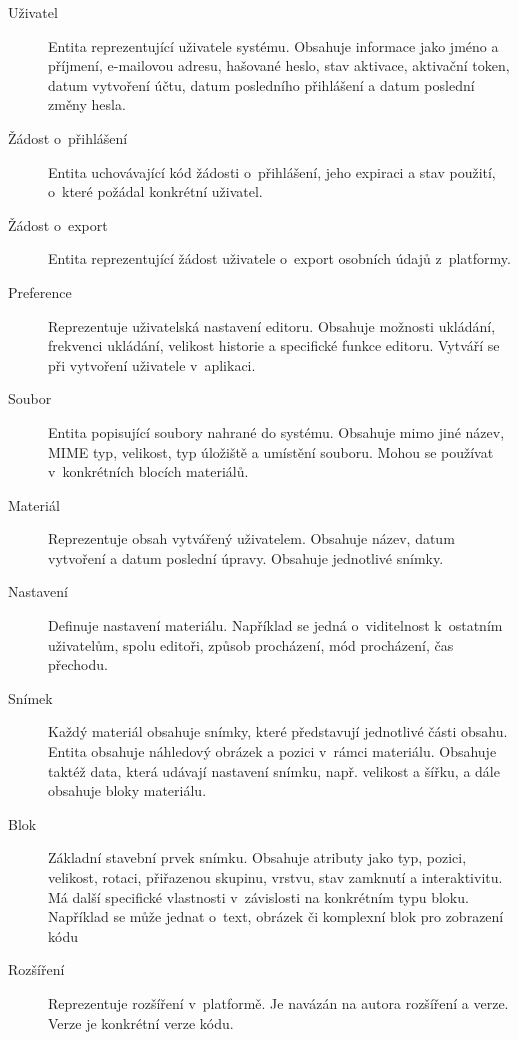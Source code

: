 \begin{description}
    \item[Uživatel] 
    Entita reprezentující uživatele systému. Obsahuje informace jako jméno a příjmení, e-mailovou adresu, hašované heslo, stav aktivace, aktivační token, datum vytvoření účtu, datum posledního přihlášení a datum poslední změny hesla.

    \item[Žádost o~přihlášení] 
    Entita uchovávající kód žádosti o~přihlášení, jeho expiraci a stav použití, o~které požádal konkrétní uživatel.
    
    \item[Žádost o~export]
    Entita reprezentující žádost uživatele o~export osobních údajů z~platformy.
    
    \item[Preference] 
    Reprezentuje uživatelská nastavení editoru. Obsahuje možnosti ukládání, frekvenci ukládání, velikost historie a specifické funkce editoru. Vytváří se při vytvoření uživatele v~aplikaci.

    \item[Soubor] 
    Entita popisující soubory nahrané do systému. Obsahuje mimo jiné název, MIME typ, velikost, typ úložiště a umístění souboru. Mohou se používat v~konkrétních blocích materiálů.
    
    \item[Materiál] 
    Reprezentuje obsah vytvářený uživatelem. Obsahuje název, datum vytvoření a datum poslední úpravy. Obsahuje jednotlivé snímky.
    
    \item[Nastavení] 
    Definuje nastavení materiálu. Například se jedná o~viditelnost k~ostatním uživatelům, spolu editoři, způsob procházení, mód procházení, čas přechodu.
    
    \item[Snímek] 
    Každý materiál obsahuje snímky, které představují jednotlivé části obsahu. Entita obsahuje náhledový obrázek a pozici v~rámci materiálu. Obsahuje taktéž data, která udávají nastavení snímku, např. velikost a šířku, a dále obsahuje bloky materiálu.
    
    \item[Blok] 
    Základní stavební prvek snímku. Obsahuje atributy jako typ, pozici, velikost, rotaci, přiřazenou skupinu, vrstvu, stav zamknutí a interaktivitu. Má další specifické vlastnosti v~závislosti na konkrétním typu bloku. Například se může jednat o~text, obrázek či komplexní blok pro zobrazení kódu
    
    \item[Rozšíření]
    Reprezentuje rozšíření v~platformě. Je navázán na autora rozšíření a verze. Verze je konkrétní verze kódu.
\end{description}


